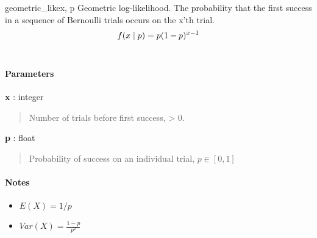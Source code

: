 \hypertarget{pymc.distributions.geometric_like}{}
\begin{funcdesc}{geometric\_like}{x, p}
Geometric log-likelihood. The probability that the first success in a
sequence of Bernoulli trials occurs on the x'th trial.
\begin{gather}
\begin{split}f(x \mid p) = p(1-p)^{x-1}\end{split}\notag\\\begin{split}\end{split}\notag
\end{gather}
\paragraph{Parameters}
\begin{paramlist}
\item[] \textbf{x} : integer
\begin{quote}

Number of trials before first success, \textgreater{} 0.
\end{quote}

\item[] \textbf{p} : float
\begin{quote}

Probability of success on an individual trial, $p \in [0,1]$
\end{quote}
\end{paramlist}
\paragraph{Notes}
\begin{itemize}
\item {}
$E(X)=1/p$

\item {}
$Var(X)=\frac{1-p}{p^2}$

\end{itemize}
\end{funcdesc}


